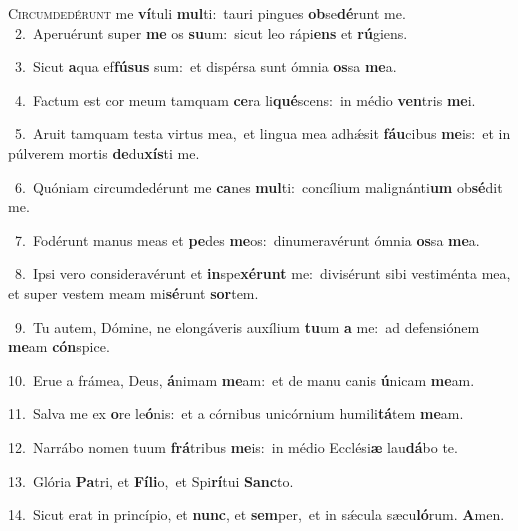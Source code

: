 \lettrine{\initial\textcolor{\initialcolor}{C}}{ircumdedérunt} me \textbf{ví}\-tuli \textbf{mul}\-ti:~\star tauri pingues \textbf{ob}\-se\-\textbf{dé}\-runt me.\\
{\numbfont\textcolor{\numbcolor}{~2.}}~Aperuérunt super \textbf{me} os \textbf{su}\-um:~\star sicut leo rápi\textbf{ens} et \textbf{rú}\-giens.\par
{\numbfont\textcolor{\numbcolor}{~3.}}~Sicut \textbf{a}\-qua ef\-\textbf{fú}\-\textbf{sus} sum:~\star et dispérsa sunt ómnia \textbf{os}\-sa \textbf{me}\-a.\par
{\numbfont\textcolor{\numbcolor}{~4.}}~Factum est cor meum tamquam \textbf{ce}\-ra li\-\textbf{qué}\-scens:~\star in médio \textbf{ven}\-tris \textbf{me}\-i.\par
{\numbfont\textcolor{\numbcolor}{~5.}}~Aruit tamquam testa virtus mea,~\dagger et lingua mea adhǽsit \textbf{fáu}\-cibus \textbf{me}\-is:~\star et in púlverem mortis \textbf{de}\-du\-\textbf{xís}\-ti me.\par
{\numbfont\textcolor{\numbcolor}{~6.}}~Quóniam circumdedérunt me \textbf{ca}\-nes \textbf{mul}\-ti:~\star concílium malignánti\textbf{um} ob\-\textbf{sé}\-dit me.\par
{\numbfont\textcolor{\numbcolor}{~7.}}~Fodérunt manus meas et \textbf{pe}\-des \textbf{me}\-os:~\star dinumeravérunt ómnia \textbf{os}\-sa \textbf{me}\-a.\par
{\numbfont\textcolor{\numbcolor}{~8.}}~Ipsi vero consideravérunt et \textbf{in}\-spe\-\textbf{xé}\-\textbf{runt} me:~\star divisérunt sibi vestiménta mea, et super vestem meam mi\-\textbf{sé}\-runt \textbf{sor}\-tem.\par
{\numbfont\textcolor{\numbcolor}{~9.}}~Tu autem, Dómine, ne elongáveris auxílium \textbf{tu}\-um \textbf{a} me:~\star ad defensiónem \textbf{me}\-am \textbf{cón}\-spice.\par
{\numbfont\textcolor{\numbcolor}{10.}}~Erue a frámea, Deus, \textbf{á}\-nimam \textbf{me}\-am:~\star et de manu canis \textbf{ú}\-nicam \textbf{me}\-am.\par
{\numbfont\textcolor{\numbcolor}{11.}}~Salva me ex \textbf{o}\-re le\-\textbf{ó}\-nis:~\star et a córnibus unicórnium humili\-\textbf{tá}\-tem \textbf{me}\-am.\par
{\numbfont\textcolor{\numbcolor}{12.}}~Narrábo nomen tuum \textbf{frá}\-tribus \textbf{me}\-is:~\star in médio Ecclési\textbf{æ} lau\-\textbf{dá}\-bo te.\par
{\numbfont\textcolor{\numbcolor}{13.}}~Glória \textbf{Pa}\-tri, et \textbf{Fí}\-\textbf{li}o,~\star et Spi\-\textbf{rí}\-tui \textbf{Sanc}\-to.\par
{\numbfont\textcolor{\numbcolor}{14.}}~Sicut erat in princípio, et \textbf{nunc}\-, et \textbf{sem}\-per,~\star et in sǽcula sæcu\-\textbf{ló}\-rum. \textbf{A}\-men.\par
